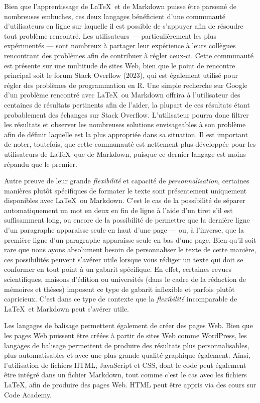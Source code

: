 \documentclass[
  letterpaper,
]{scrbook}
\begin{document}
Bien que l'apprentissage de \LaTeX~et de Markdown puisse être parsemé de
nombreuses embuches, ces deux langages bénéficient d'une communauté
d'utilisateurs en ligne sur laquelle il est possible de s'appuyer afin
de résoudre tout problème rencontré. Les utilisateurs ---
particulièrement les plus expérimentés --- sont nombreux à partager leur
expérience à leurs collègues rencontrant des problèmes afin de
contribuer à régler ceux-ci. Cette communauté est présente sur une
multitude de sites Web, bien que le point de rencontre principal soit le
forum Stack Overflow (2023), qui est également utilisé pour régler des
problèmes de programmation en R. Une simple recherche sur Google d'un
problème rencontré avec \LaTeX~ou Markdown offrira à l'utilisateur des
centaines de résultats pertinents afin de l'aider, la plupart de ces
résultats étant probablement des échanges sur Stack Overflow.
L'utilisateur pourra donc filtrer les résultats et observer les
nombreuses solutions envisageables à son problème afin de définir
laquelle est la plus appropriée dans sa situation. Il est important de
noter, toutefois, que cette communauté est nettement plus développée
pour les utilisateurs de \LaTeX~que de Markdown, puisque ce dernier
langage est moins répandu que le premier.

Autre preuve de leur grande \emph{flexibilité} et capacité de
\emph{personnalisation}, certaines manières plutôt spécifiques de
formater le texte sont présentement uniquement disponibles avec
\LaTeX~ou Markdown. C'est le cas de la possibilité de séparer
automatiquement un mot en deux en fin de ligne à l'aide d'un tiret s'il
est suffisamment long, ou encore de la possibilité de permettre que la
dernière ligne d'un paragraphe apparaisse seule en haut d'une page ---
ou, à l'inverse, que la première ligne d'un paragraphe apparaisse seule
en bas d'une page. Bien qu'il soit rare que nous ayons absolument besoin
de personnaliser le texte de cette manière, ces possibilités peuvent
s'avérer utile lorsque vous rédiger un texte qui doit se conformer en
tout point à un gabarit spécifique. En effet, certaines revues
scientifiques, maisons d'édition ou universités (dans le cadre de la
rédaction de mémoires et thèses) imposent ce type de gabarit inflexible
et parfois plutôt capricieux. C'est dans ce type de contexte que la
\emph{flexibilité} incomparable de \LaTeX~et Markdown peut s'avérer
utile.

Les langages de balisage permettent également de créer des pages Web.
Bien que les pages Web puissent être créées à partir de sites Web comme
WordPress, les langages de balisage permettent de produire des résultats
plus personnalisables, plus automatisables et avec une plus grande
qualité graphique également. Ainsi, l'utilisation de fichiers HTML,
JavaScript et CSS, dont le code peut également être intégré dans un
fichier Markdown, tout comme c'est le cas avec les fichiers \LaTeX, afin
de produire des pages Web. HTML peut être appris via des cours sur Code
Academy.
\end{document}
